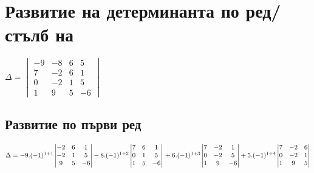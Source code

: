 \documentclass{article}
\begin{document}
    \section{Развитие на детерминанта по ред/стълб на}
    \(\Delta = \begin{vmatrix}
        -9 & -8 & 6 & 5\\
        7 & -2 & 6 & 1\\
        0 & -2 & 1 & 5\\
        1 & 9 & 5 & -6
    \end{vmatrix}\)
    \subsection{Развитие по първи ред}
    \(\Delta = -9.(-1)^{1 + 1} \begin{vmatrix}
        -2 & 6 & 1\\
        -2 & 1 & 5\\
         9 & 5 & -6
    \end{vmatrix} - 8.(-1)^{1 + 2} \begin{vmatrix}
        7 & 6 & 1\\
        0 & 1 & 5\\
        1 & 5 & -6
    \end{vmatrix} \\\\\\
    + 6.(-1)^{1 + 3} \begin{vmatrix}
        7 & -2 & 1\\
        0 & -2 & 5\\
        1 & 9 & -6
    \end{vmatrix} + 5.(-1)^{1 + 4} \begin{vmatrix}
        7 & -2 & 6\\
        0 & -2 & 1\\
        1 & 9 & 5
    \end{vmatrix}\)
\end{document}

